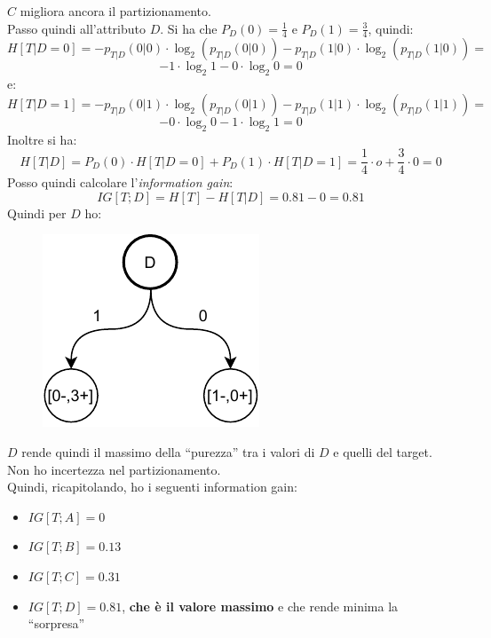 \documentclass[a4paper,12pt, oneside]{book}
\begin{document}
\begin{esercizio}
\begin{figure}[H]
  \end{figure}
  $C$ migliora ancora il partizionamento.\\
  Passo quindi all'attributo $D$. Si ha che $P_D(0)=\frac{1}{4}$ e
  $P_D(1)=\frac{3}{4}$, quindi:
  \[H[T|D=0]=-p_{T|D}(0|0)\cdot \log_2(p_{T|D}(0|0))-p_{T|D}(1|0)\cdot
    \log_2(p_{T|D}(1|0))=\]
  \[-1\cdot \log_2 1-0\cdot \log_2 0=0\]
  e:
  \[H[T|D=1]=-p_{T|D}(0|1)\cdot \log_2(p_{T|D}(0|1))-p_{T|D}(1|1)\cdot
    \log_2(p_{T|D}(1|1))=\]
  \[-0\cdot \log_2 0-1\cdot \log_2 1=0\]
  Inoltre si ha:
  \[H[T|D]=P_D(0)\cdot H[T|D=0]+P_D(1)\cdot H[T|D=1]=\frac{1}{4}\cdot
    o+\frac{3}{4}\cdot 0=0\]
  Posso quindi calcolare l'\textit{information gain}:
  \[IG[T;D]=H[T]-H[T|D]=0.81-0=0.81\]
  Quindi per $D$ ho:
  \begin{figure}[H]
    \centering
    \includegraphics[scale = 0.9]{img/id4.pdf}
  \end{figure}
  $D$ rende quindi il massimo della ``purezza'' tra i valori di $D$ e quelli del
  target. Non ho incertezza nel partizionamento.\\
  Quindi, ricapitolando, ho i seguenti information gain:
  \begin{itemize}
    \item $IG[T;A]=0$
    \item $IG[T;B]=0.13$
    \item $IG[T;C]=0.31$
    \item $IG[T;D]=0.81$, \textbf{che è il valore massimo} e che rende minima la
    ``sorpresa''
  \end{itemize}
\end{esercizio}
\end{document}
